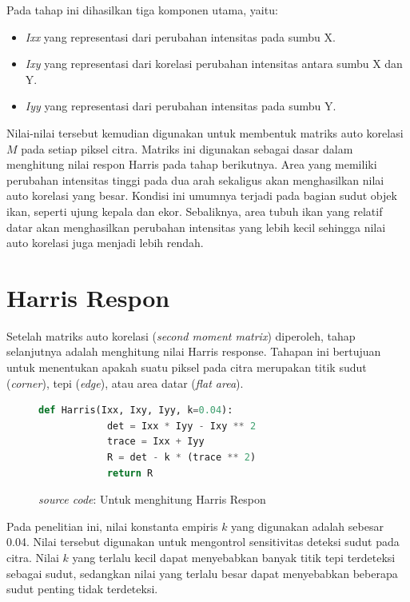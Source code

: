 Pada tahap ini dihasilkan tiga komponen utama, yaitu:
\begin{itemize}
    \item \emph{Ixx} yang representasi dari perubahan intensitas pada sumbu X\@.
    \item \emph{Ixy} yang representasi dari korelasi perubahan intensitas antara sumbu X dan Y\@.
    \item \emph{Iyy} yang representasi dari perubahan intensitas pada sumbu Y\@.
\end{itemize}

Nilai-nilai tersebut kemudian digunakan untuk membentuk matriks auto korelasi $M$ pada setiap piksel citra. Matriks ini digunakan sebagai dasar dalam menghitung nilai respon Harris pada tahap berikutnya.
Area yang memiliki perubahan intensitas tinggi pada dua arah sekaligus akan menghasilkan nilai auto korelasi yang besar. Kondisi ini umumnya terjadi pada bagian sudut objek ikan, seperti ujung kepala dan ekor. 
Sebaliknya, area tubuh ikan yang relatif datar akan menghasilkan perubahan intensitas yang lebih kecil sehingga nilai auto korelasi juga menjadi lebih rendah.

\section{Harris Respon}
    Setelah matriks auto korelasi (\emph{second moment matrix}) diperoleh, tahap selanjutnya adalah menghitung nilai Harris response. 
Tahapan ini bertujuan untuk menentukan apakah suatu piksel pada citra merupakan titik sudut (\emph{corner}), tepi (\emph{edge}), atau area datar (\emph{flat area}).

\begin{figure}[H]
    \begin{lstlisting}[language=Python, basicstyle=\tiny]
        def Harris(Ixx, Ixy, Iyy, k=0.04):
            det = Ixx * Iyy - Ixy ** 2
            trace = Ixx + Iyy
            R = det - k * (trace ** 2)
            return R
    \end{lstlisting}
    \caption{\emph{source code}: Untuk menghitung Harris Respon}
\end{figure}

Pada penelitian ini, nilai konstanta empiris $k$ yang digunakan adalah sebesar 0.04. 
Nilai tersebut digunakan untuk mengontrol sensitivitas deteksi sudut pada citra. 
Nilai $k$ yang terlalu kecil dapat menyebabkan banyak titik tepi terdeteksi sebagai sudut, sedangkan nilai yang terlalu besar dapat menyebabkan beberapa sudut penting tidak terdeteksi.

